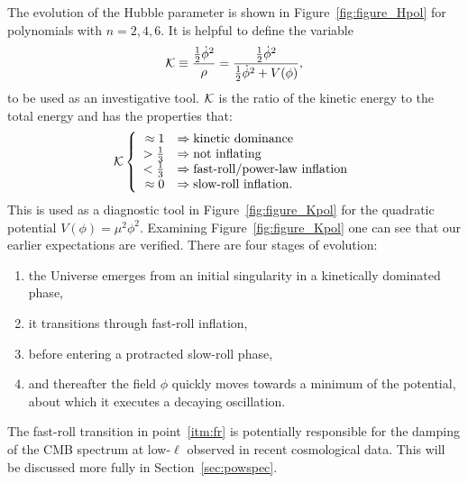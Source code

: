 The evolution of the Hubble parameter is shown in Figure~\ref{fig:figure_Hpol} for polynomials with $n=2,4,6$. It is helpful to define the variable
%
\begin{equation}
  \mathcal{K} 
  \equiv  
  \frac{\frac{1}{2}\dot{\phi}^2  }{\rho}  
  =  
  \frac{\frac{1}{2}\dot{\phi}^2  }
  {\frac{1}{2}\dot{\phi}^2 + V(\phi)},
\end{equation}
%
to be used as an investigative tool. $\mathcal{K}$ is the ratio of the kinetic energy to the total energy and has the properties that:
%
\begin{equation}
  \Kfrac 
    \left\{
    \begin{array}{rl}
      \approx 1 &\Rightarrow \hbox{kinetic dominance} 
      \\
      >\frac{1}{3} &\Rightarrow \hbox{not inflating}
      \\
      <\frac{1}{3} &\Rightarrow \hbox{fast-roll/power-law inflation}
      \\
      \approx 0 &\Rightarrow \hbox{slow-roll inflation.}
    \end{array}
%
    \right.
\end{equation}
%
This is used as a diagnostic tool in Figure~\ref{fig:figure_Kpol} for the quadratic potential $V(\phi) = \mu^2\phi^2$. Examining Figure~\ref{fig:figure_Kpol} one can see that our earlier expectations are verified. There are four stages of evolution:
%
\begin{enumerate}
  \item the Universe emerges from an initial singularity in a
    kinetically dominated phase,
  \item it transitions through fast-roll inflation,\label{itm:fr}
  \item before entering a protracted slow-roll phase, 
  \item and thereafter the field $\phi$ quickly moves towards a minimum of the potential, about which it executes a decaying oscillation.
\end{enumerate}
%
The fast-roll transition in point~\eqref{itm:fr} is potentially responsible for the damping of the CMB spectrum at low-$\ell$ observed in recent cosmological data. This will be discussed more fully in Section~\ref{sec:powspec}.


